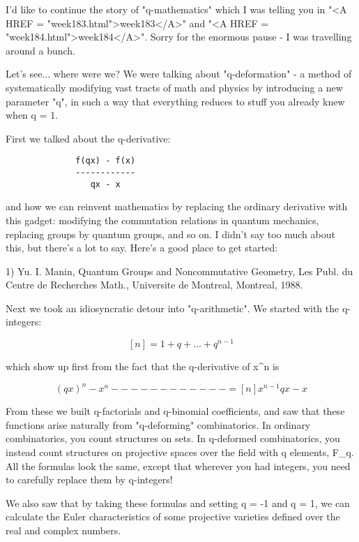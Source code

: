 




I'd like to continue the story of "q-mathematics" which I was
telling you in "<A HREF = "week183.html">week183</A>" and
"<A HREF = "week184.html">week184</A>".  Sorry for the
enormous pause - I was travelling around a bunch.

Let's see... where were we?  We were talking about "q-deformation" - 
a method of systematically modifying vast tracts of math and physics by
introducing a new parameter "q", in such a way that everything reduces
to stuff you already knew when q = 1.

First we talked about the q-derivative:

\begin{verbatim}
              f(qx) - f(x)
              ------------
                 qx - x
\end{verbatim}
    
and how we can reinvent mathematics by replacing the ordinary
derivative with this gadget: modifying the commutation relations in
quantum mechanics, replacing groups by quantum groups, and so on.  
I didn't say too much about this, but there's a lot to say.  Here's a
good place to get started:

1) Yu. I. Manin, Quantum Groups and Noncommutative Geometry, Les
Publ. du Centre de Recherches Math., Universite de Montreal, Montreal,
1988.

Next we took an idiosyncratic detour into "q-arithmetic".  We
started with the q-integers:

$$
[n] = 1 + q + ... + q^{n-1}
$$
    
which show up first from the fact that the q-derivative of x^{n} is 

$$
               (qx)^{n} - x^{n}
              ------------ = [n] x^{n-1}
                 qx - x
$$
    
From these we built q-factorials and q-binomial coefficients, and saw
that these functions arise naturally from "q-deforming"
combinatorics.  In ordinary combinatorics, you count structures on sets.
In q-deformed combinatorics, you instead count structures on projective
spaces over the field with q elements, F_{q}.  All the formulas look the
same, except that wherever you had integers, you need to carefully
replace them by q-integers!

We also saw that by taking these formulas and setting q = -1 and q = 1, 
we can calculate the Euler characteristics of some projective varieties 
defined over the real and complex numbers.  

